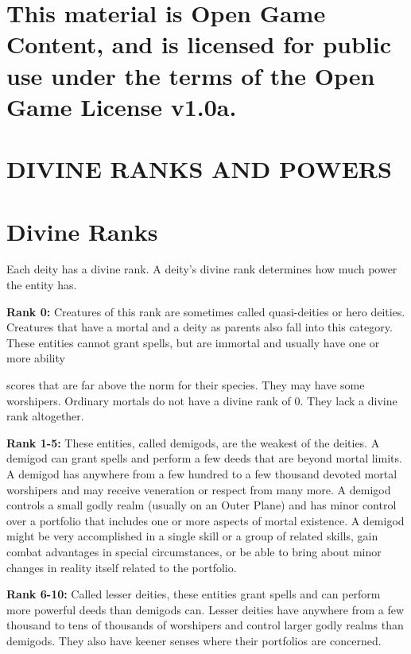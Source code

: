 \documentclass{article}
\begin{document}
\section*{This material is Open Game Content, and is licensed for public use under 
the terms of the Open Game License v1.0a.}

\section*{{\LARGE{}DIVINE RANKS AND POWERS}}

\vspace{12pt}
\section*{Divine Ranks}

Each deity has a divine rank. A deity's divine rank determines how much power the 
entity has.

\vspace{12pt}
\textbf{Rank 0:} Creatures of this rank are sometimes called quasi-deities or hero 
deities. Creatures that have a mortal and a deity as parents also fall into this 
category. These entities cannot grant spells, but are immortal and usually have 
one or more ability

scores that are far above the norm for their species. They may have some worshipers. 
Ordinary mortals do not have a divine rank of 0. They lack a divine rank altogether.

\vspace{12pt}
\textbf{Rank 1-5:} These entities, called demigods, are the weakest of the deities. 
A demigod can grant spells and perform a few deeds that are beyond mortal limits. 
A demigod has anywhere from a few hundred to a few thousand devoted mortal worshipers 
and may receive veneration or respect from many more. A demigod controls a small 
godly realm (usually on an Outer Plane) and has minor control over a portfolio 
that includes one or more aspects of mortal existence. A demigod might be very 
accomplished in a single skill or a group of related skills, gain combat advantages 
in special circumstances, or be able to bring about minor changes in reality itself 
related to the portfolio.

\vspace{12pt}
\textbf{Rank 6-10:} Called lesser deities, these entities grant spells and can 
perform more powerful deeds than demigods can. Lesser deities have anywhere from 
a few thousand to tens of thousands of worshipers and control larger godly realms 
than demigods. They also have keener senses where their portfolios are concerned.
\end{document}

